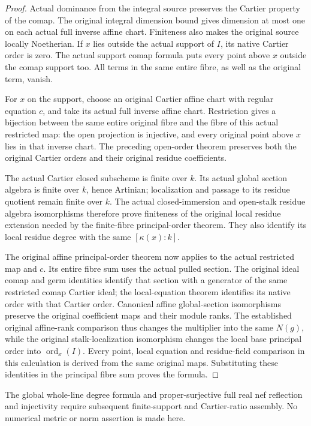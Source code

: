 \begin{proof}
Actual dominance from the integral source preserves the Cartier
property of the comap. The original integral dimension bound gives dimension at most one
on each actual full inverse affine chart. Finiteness also makes the
original source locally Noetherian. If $x$ lies outside the actual
support of $I$, its native Cartier order is zero. The actual support
comap formula puts every point above $x$ outside the comap support too.
All terms in the same entire fibre, as well as the original term, vanish.

For $x$ on the support, choose an original Cartier affine chart with
regular equation $c$, and take its actual full inverse affine chart.
Restriction gives a bijection between the same entire original fibre
and the fibre of this actual restricted map: the open projection is
injective, and every original point above $x$ lies in that inverse
chart. The preceding open-order theorem preserves both the original
Cartier orders and their original residue coefficients.

The actual Cartier closed subscheme is finite over $k$. Its actual
global section algebra is finite over $k$, hence Artinian; localization
and passage to its residue quotient remain finite over $k$. The actual
closed-immersion and open-stalk residue algebra isomorphisms therefore
prove finiteness of the original local residue extension needed by the
finite-fibre principal-order theorem. They also identify its local
residue degree with the same $[\kappa(x):k]$.

The original affine principal-order theorem now applies to the actual
restricted map and $c$. Its entire fibre sum uses the actual pulled
section. The original ideal comap and germ identities identify that
section with a generator of the same restricted comap Cartier ideal;
the local-equation theorem identifies its native order with that
Cartier order. Canonical affine global-section isomorphisms preserve
the original coefficient maps and their module ranks. The established
original affine-rank comparison thus changes the multiplier into the
same $N(g)$, while the original stalk-localization isomorphism changes
the local base principal order into $\operatorname{ord}_x(I)$.
Every point, local equation and residue-field comparison in this
calculation is derived from the same original maps. Substituting these
identities in the principal fibre sum proves the formula.
\end{proof}

The global whole-line degree formula and proper-surjective full real nef
reflection and injectivity require subsequent finite-support and
Cartier-ratio assembly. No numerical metric or norm assertion is made
here.
